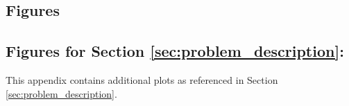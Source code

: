 \documentclass[12pt]{article}
\begin{document}
\begin{appendices}

		
		\newpage
		\section{Figures} \label{app:figures}
		
		\subsection{Figures for Section \ref{sec:problem_description}: } \label{sapp:figures_problem_description}
		This appendix contains additional plots as referenced in Section \ref{sec:problem_description}.
		

\end{appendices}
\end{document}

